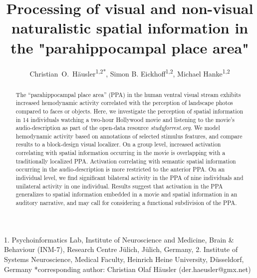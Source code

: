 \documentclass[english]{article}
\begin{document}




\title{Processing of visual and non-visual naturalistic spatial information in
  the "parahippocampal place area"}

\author{
    Christian~O.~Häusler\textsuperscript{1,2{*}},
    Simon B. Eickhoff\textsuperscript{1,2},
    Michael Hanke\textsuperscript{1,2}}

\maketitle
\thispagestyle{fancy}

1. Psychoinformatics Lab, Institute of Neuroscience and Medicine, Brain \&
Behaviour (INM-7), Research Centre Jülich, Jülich, Germany, 2. Institute of
Systems Neuroscience, Medical Faculty, Heinrich Heine University,  Düsseldorf,
Germany {*}corresponding author: Christian Olaf Häusler (der.haeusler@gmx.net)


\begin{abstract}
The ``parahippocampal place area'' (PPA) in the human ventral visual stream
exhibits increased hemodynamic activity correlated with the perception of
landscape photos compared to faces or objects.
Here, we investigate the perception of spatial information in 14 individuals
watching a two-hour Hollywood movie and listening to the movie's
audio-description as part of the open-data resource \textit{studyforrest.org}.
We model hemodynamic activity based on annotations of selected stimulus
features,
and compare results to a block-design visual localizer.
On a group level, increased activation correlating with spatial information
occurring in the movie is overlapping with a traditionally localized PPA.
Activation correlating with semantic spatial information occurring in the
audio-description is more restricted to the anterior PPA.
On an individual level, we find significant bilateral activity in the PPA
of nine individuals and unilateral activity in one individual.
Results suggest that activation in the PPA generalizes to spatial information
embedded in a movie and spatial information in an auditory narrative, and may
call for considering a functional subdivision of the PPA.  \end{abstract}
\end{document}
